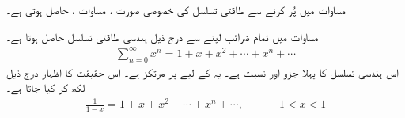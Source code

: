 مساوات  میں  پُر کرنے سے طاقتی تسلسل کی خصوصی صورت ، مساوات  ، حاصل ہوتی ہے۔

مساوات  میں تمام  ضرائب    لینے سے درج ذیل ہندسی طاقتی تسلسل حاصل ہوتا ہے۔
\begin{align*}
\sum_{n=0}^{\infty}x^n=1+x+x^2+\cdots+x^n+\cdots
\end{align*}
اس ہندسی تسلسل کا پہلا جزو  اور نسبت  ہے۔ یہ  کے لیے  پر مرتکز ہے۔ اس حقیقت کا اظہار درج ذیل لکھ کر کیا جاتا ہے۔
\begin{align}\label{مساوات_تسلسل_تعریف_طاقتی_پ}
\frac{1}{1-x}=1+x+x^2+\cdots+x^n+\cdots,\quad\quad -1<x<1
\end{align}

